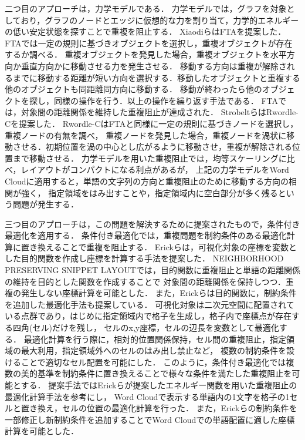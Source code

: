 \documentclass[syuuron]{kuee}
\begin{document}
		二つ目のアプローチは，力学モデルである．
		力学モデルでは，グラフを対象としており，グラフのノードとエッジに仮想的な力を割り当て，力学的エネルギーの低い安定状態を探すことで重複を阻止する．
		XiaodiらはFTAを提案した\cite{fta1}．
		FTAでは一定の規則に基づきオブジェクトを選択し，重複オブジェクトが存在するか調べる．
		重複オブジェクトを発見した場合，重複オブジェクトを水平方向か垂直方向かに移動させる力を発生させる．
		移動する方向は重複が解除されるまでに移動する距離が短い方向を選択する．移動したオブジェクトと重複する他のオブジェクトも同距離同方向に移動する．
		移動が終わったら他のオブジェクトを探し，同様の操作を行う．以上の操作を繰り返す手法である．
		FTAでは，対象間の距離関係を維持した重複阻止が達成された．
		StrobeltらはRwordle-Cを提案した\cite{rwc1}．
		Rwordle-CはFTAと同様に一定の規則に基づきノードを選択し，重複ノードの有無を調べ，
		重複ノードを発見した場合，重複ノードを渦状に移動させる．初期位置を渦の中心とし広がるように移動させ，重複が解除される位置まで移動させる．
		力学モデルを用いた重複阻止では，均等スケーリングに比べ，レイアウトがコンパクトになる利点があるが，
		上記の力学モデルをWord Cloudに適用すると，単語の文字列の方向と重複阻止のために移動する方向の相関が強く，
		指定領域をはみ出すことや，指定領域内に空白部分が多く残るという問題が発生する．
		
		三つ目のアプローチは，この問題を解決するために提案されたもので，条件付き最適化を適用する．
		条件付き最適化では，重複問題を制約条件のある最適化計算に置き換えることで重複を阻止する．
		Erickらは，可視化対象の座標を変数とした目的関数を作成し座標を計算する手法を提案した\cite{or1}．
		NEIGHBORHOOD PRESERVING SNIPPET LAYOUTでは，目的関数に重複阻止と単語の距離関係の維持を目的とした関数を作成することで
		対象間の距離関係を保持しつつ．重複の発生しない座標計算を可能とした．
		また，Erickらは目的関数に，制約条件を追加した最適化手法も提案している\cite{or2}． 
		可視化対象は二次元空間に配置されている点群であり，はじめに指定領域内で格子を生成し，格子内で座標点が存在する四角(セル)だけを残し，
		セルのx,y座標，セルの辺長を変数として最適化する．
		最適化計算を行う際に，相対的位置関係保持，セル間の重複阻止，指定領域の最大利用，指定領域外へのセルのはみ出し禁止など，
		複数の制約条件を設けることで適切なセル配置を可能にした．
		このように，条件付き最適化では複数の美的基準を制約条件に置き換えることで様々な条件を満たした重複阻止を可能とする．
		提案手法ではErickらが提案したエネルギー関数を用いた重複阻止の最適化計算手法を参考にし，
		Word Cloudで表示する単語内の1文字を格子の1セルと置き換え，セルの位置の最適化計算を行った．
		また，Erickらの制約条件を一部修正し新制約条件を追加することでWord Cloudでの単語配置に適した座標計算を可能とした．
		
\end{document}
